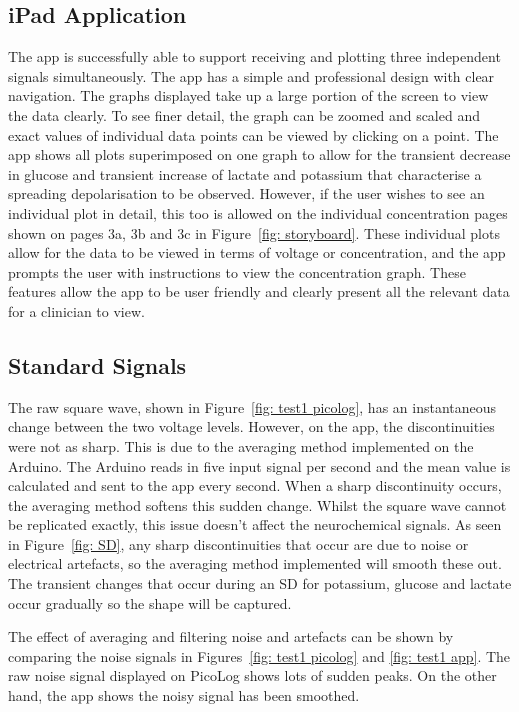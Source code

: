 \subsection{iPad Application}
The app is successfully able to support receiving and plotting three independent signals simultaneously. The app has a simple and professional design with clear navigation. The graphs displayed take up a large portion of the screen to view the data clearly. To see finer detail, the graph can be zoomed and scaled and exact values of individual data points can be viewed by clicking on a point. The app shows all plots superimposed on one graph to allow for the transient decrease in glucose and transient increase of lactate and potassium that characterise a spreading depolarisation to be observed. However, if the user wishes to see an individual plot in detail, this too is allowed on the individual concentration pages shown on pages 3a, 3b and 3c in Figure~\ref{fig: storyboard}. These individual plots allow for the data to be viewed in terms of voltage or concentration, and the app prompts the user with instructions to view the concentration graph. These features allow the app to be user friendly and clearly present all the relevant data for a clinician to view.



\subsection{Standard Signals}

The raw square wave, shown in Figure~\ref{fig: test1 picolog}, has an instantaneous change between the two voltage levels. However, on the app, the discontinuities were not as sharp. This is due to the averaging method implemented on the Arduino. The Arduino reads in five input signal per second and the mean value is calculated and sent to the app every second. When a sharp discontinuity occurs, the averaging method softens this sudden change. Whilst the square wave cannot be replicated exactly, this issue doesn't affect the neurochemical signals. As seen in Figure~\ref{fig: SD}, any sharp discontinuities that occur are due to noise or electrical artefacts, so the averaging method implemented will smooth these out. The transient changes that occur during an SD for potassium, glucose and lactate occur gradually so the shape will be captured.

The effect of averaging and filtering noise and artefacts can be shown by comparing the noise signals in Figures~\ref{fig: test1 picolog} and \ref{fig: test1 app}. The raw noise signal displayed on PicoLog shows lots of sudden peaks. On the other hand, the app shows the noisy signal has been smoothed. 


